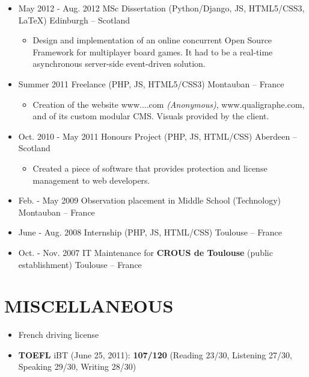 \documentclass{res}
\begin{document}
\begin{resume}
\begin{itemize}
                \item[] May 2012 - Aug. 2012 \tabto{5cm} MSc Dissertation (Python/Django, JS, HTML5/CSS3, \LaTeX{}) \hfill Edinburgh -- Scotland
                \begin{itemize}
                        \item[] Design and implementation of an online concurrent Open Source Framework for multiplayer board games. It had to be a real-time asynchronous server-side event-driven solution. 
                \end{itemize}
                \item[] Summer 2011 \tabto{5cm} Freelance (PHP, JS, HTML5/CSS3) \hfill Montauban -- France
                \begin{itemize}
                        \item[] Creation of the website \ifisanon www....com \textit{(Anonymous)}, \else www.qualigraphe.com, \fi and of its custom modular CMS. Visuals provided by the client. 
                \end{itemize}
                \item[] Oct. 2010 - May 2011 \tabto{5cm} Honours Project (PHP, JS, HTML/CSS) \hfill Aberdeen -- Scotland
                \begin{itemize}
                        \item[] Created a piece of software that provides protection and license management to web developers.
                \end{itemize}
                \item[] Feb. - May 2009 \tabto{5cm} Observation placement in Middle School (Technology) \hfill Montauban -- France
                \item[] June - Aug. 2008 \tabto{5cm} Internship (PHP, JS, HTML/CSS) \hfill Toulouse -- France
                \item[] Oct. - Nov. 2007 \tabto{5cm} IT Maintenance for \textbf{CROUS de Toulouse} (public establishment) \hfill Toulouse -- France
        \end{itemize}
        
\section{MISCELLANEOUS}  
        \begin{itemize}
                \item[] French driving license
                \item[] \textbf{TOEFL} iBT (June 25, 2011): \textbf{107/120} (Reading 23/30, Listening 27/30, Speaking 29/30, Writing 28/30)
                    \end{itemize} 
 

\end{resume}
\end{document}

